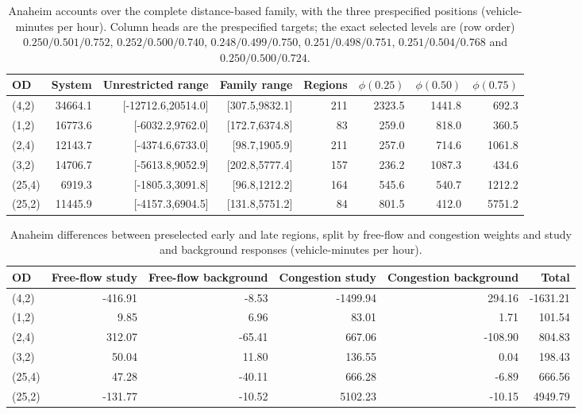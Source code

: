 \begin{table}[pos=htbp]\centering\footnotesize\caption{Anaheim accounts over the complete distance-based family, with the three prespecified positions (vehicle-minutes per hour). Column heads are the prespecified targets; the exact selected levels are (row order) $0.250/0.501/0.752$, $0.252/0.500/0.740$, $0.248/0.499/0.750$, $0.251/0.498/0.751$, $0.251/0.504/0.768$ and $0.250/0.500/0.724$.}\label{tab:anaheim}\begin{tabular}{lrrrrrrr}\toprule OD & System & Unrestricted range & Family range & Regions & $\phi(0.25)$ & $\phi(0.50)$ & $\phi(0.75)$\\\midrule
(4,2) & 34664.1 & [-12712.6,20514.0] & [307.5,9832.1] & 211 & 2323.5 & 1441.8 & 692.3\\
(1,2) & 16773.6 & [-6032.2,9762.0] & [172.7,6374.8] & 83 & 259.0 & 818.0 & 360.5\\
(2,4) & 12143.7 & [-4374.6,6733.0] & [98.7,1905.9] & 211 & 257.0 & 714.6 & 1061.8\\
(3,2) & 14706.7 & [-5613.8,9052.9] & [202.8,5777.4] & 157 & 236.2 & 1087.3 & 434.6\\
(25,4) & 6919.3 & [-1805.3,3091.8] & [96.8,1212.2] & 164 & 545.6 & 540.7 & 1212.2\\
(25,2) & 11445.9 & [-4157.3,6904.5] & [131.8,5751.2] & 84 & 801.5 & 412.0 & 5751.2\\
\bottomrule\end{tabular}\end{table}
\begin{table}[pos=htbp]\centering\footnotesize\caption{Anaheim differences between preselected early and late regions, split by free-flow and congestion weights and study and background responses (vehicle-minutes per hour).}\label{tab:anaheimmechanism}\begin{tabular}{lrrrrr}\toprule OD & Free-flow study & Free-flow background & Congestion study & Congestion background & Total\\\midrule
(4,2) & -416.91 & -8.53 & -1499.94 & 294.16 & -1631.21\\
(1,2) & 9.85 & 6.96 & 83.01 & 1.71 & 101.54\\
(2,4) & 312.07 & -65.41 & 667.06 & -108.90 & 804.83\\
(3,2) & 50.04 & 11.80 & 136.55 & 0.04 & 198.43\\
(25,4) & 47.28 & -40.11 & 666.28 & -6.89 & 666.56\\
(25,2) & -131.77 & -10.52 & 5102.23 & -10.15 & 4949.79\\
\bottomrule\end{tabular}\end{table}
